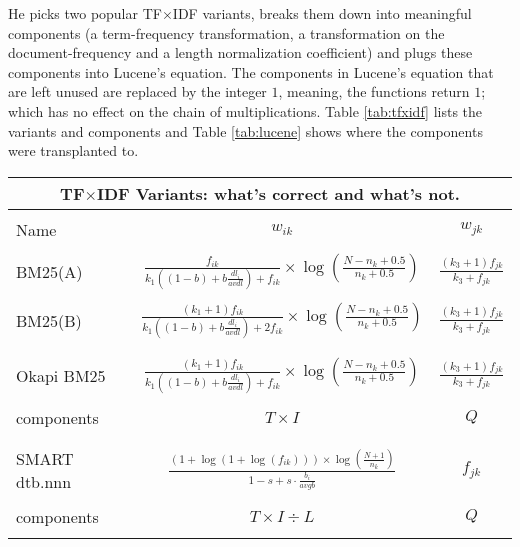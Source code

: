He picks two popular TF$\times$IDF variants, breaks them down into meaningful
components (a term-frequency transformation, a transformation on the
document-frequency and a length normalization coefficient) and plugs
these components into Lucene's equation. The components in Lucene's
equation that are left unused are replaced by the integer $1$,
meaning, the functions return $1$; which has no effect on the chain of
multiplications. Table \ref{tab:tfxidf} lists the variants and
components and Table \ref{tab:lucene} shows where the components were
transplanted to.

\begin{table}
  \centering
  \small
  \begin{minipage}[t]{0.65\textwidth}
    
    \begin{tabular}{lcc}
      \multicolumn{3}{c}{TF$\times$IDF Variants: what's correct and what's not.}\\
      \hline\hline
      \\
      Name & $w_{ik}$ & $w_{jk}$\\
      \hline
      \\
      BM25(A)
      & $\frac{f_{ik}}{k_{1}((1-b)+b\frac{dl_{i}}{avdl})+f_{ik}} \times \log(\frac{N-n_{k}+0.5}{n_{k}+0.5})$
      & $\frac{(k_{3}+1)f_{jk}}{k_{3}+f_{jk}}$ \\
      \\
      BM25(B)
      & $\frac{(k_{1}+1)f_{ik}}{k_{1}((1-b)+b\frac{dl_{i}}{avdl})+2f_{ik}} \times \log(\frac{N-n_{k}+0.5}{n_{k}+0.5})$
      & $\frac{(k_{3}+1)f_{jk}}{k_{3}+f_{jk}}$ \\
      \\\hline
      \\
      Okapi BM25
      & $\frac{(k_{1}+1)f_{ik}}{k_{1}((1-b)+b\frac{dl_{i}}{avdl})+f_{ik}} \times \log(\frac{N-n_{k}+0.5}{n_{k}+0.5})$
      & $\frac{(k_{3}+1)f_{jk}}{k_{3}+f_{jk}}$ \\
      \\
      components & $T \times I$ & $Q$ \\
      \\\hline
      \\
      SMART dtb.nnn
      & $\frac{(1+\log(1+\log(f_{ik}))) \times \log(\frac{N+1}{n_{k}})}{1-s+s \cdot \frac{b_{i}}{avgb}}$
      & $f_{jk}$ \\
      \\
      components & $T \times I \div L$ & $Q$ \\
      \\\hline\hline

\end{tabular}
\end{minipage}
\end{table}
